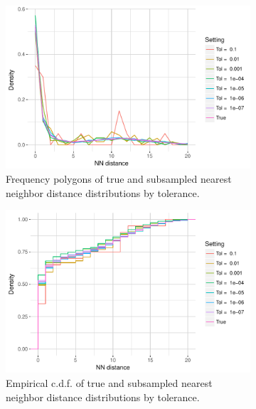 \documentclass{article}
\begin{document}
\begin{figure}
    \begin{subfigure}{.49\textwidth}
        \includegraphics[width=\linewidth]{Figures/NearestNeighbor/CDR3/freqpoly_by_tol.pdf}
   		\caption{Frequency polygons of true and subsampled nearest neighbor distance distributions by tolerance.}
    	\label{fig:NNFreqPoly}
    \end{subfigure}
    \begin{subfigure}{.49\textwidth}
        \includegraphics[width=\linewidth]{Figures/NearestNeighbor/CDR3/ecdf_by_tol.pdf}
    	\caption{Empirical c.d.f. of true and subsampled nearest neighbor distance distributions by tolerance.}
    	\label{fig:NNECDF}
    \end{subfigure}
    \begin{subfigure}{.49\textwidth}

\end{subfigure}
\end{figure}
\end{document}
